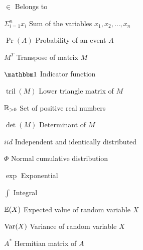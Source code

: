   \begin{simbolos}
    \item[$\in$] Belongs to 
    \item[$\Sigma_{i=1}^n x_i$] Sum of the variables $x_1, x_2, \dots, x_n$
    \item[$\Pr(A)$] Probability of an event $A$
    \item[$M^T$] Transpose of matrix $M$
    \item[$\ind$] Indicator function 
    \item[$\operatorname{tril}(M)$] Lower triangle matrix of $M$
    \item[$\mathbb{R}_{>0}$] Set of positive real numbers
    \item[$\det(M)$] Determinant of $M$ 
    \item[$iid$] Independent and identically distributed
    \item[$\Phi$] Normal cumulative distribution
    \item[$\exp$] Exponential  
    \item[$\int$] Integral 
    \item[$\mathbb{E}(X)$] Expected value of random variable $X$ 
    \item[$\operatorname{Var}(X)$] Variance of random variable $X$
    \item[$A^*$] Hermitian matrix of $A$ 
  \end{simbolos}